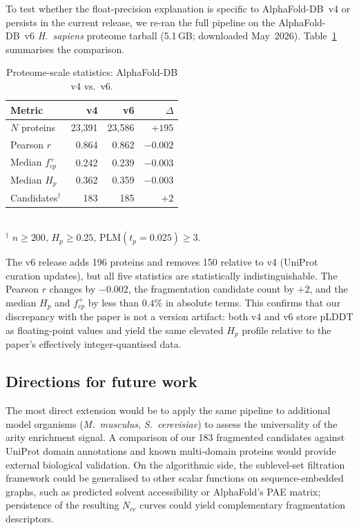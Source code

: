 To test whether the float-precision explanation is specific to
AlphaFold-DB~v4 or persists in the current release, we re-ran the full
pipeline on the AlphaFold-DB~v6 \textit{H.~sapiens} proteome tarball
(5.1\,GB; downloaded May~2026).
Table~\ref{tab:v4v6} summarises the comparison.

\begin{table}[h]
  \caption{Proteome-scale statistics: AlphaFold-DB v4 vs.\ v6.}
  \label{tab:v4v6}
  \centering
  \small
  \begin{tabular}{@{}lrrr@{}}
    \toprule
    Metric & v4 & v6 & $\Delta$ \\
    \midrule
    $N$ proteins           & 23{,}391 & 23{,}586 & $+195$   \\
    Pearson $r$            & 0.864    & 0.862    & $-0.002$ \\
    Median $f^+_{cp}$      & 0.242    & 0.239    & $-0.003$ \\
    Median $H_p$           & 0.362    & 0.359    & $-0.003$ \\
    Candidates$^\dagger$   & 183      & 185      & $+2$     \\
    \bottomrule
  \end{tabular}\\[3pt]
  \footnotesize $^\dagger$ $n \geq 200$, $H_p \geq 0.25$,
  $\mathrm{PLM}(t_p{=}0.025) \geq 3$.
\end{table}

The v6 release adds 196 proteins and removes 150 relative to v4 (UniProt
curation updates), but all five statistics are statistically
indistinguishable.
The Pearson $r$ changes by $-0.002$, the fragmentation candidate count by
$+2$, and the median $H_p$ and $f^+_{cp}$ by less than $0.4\%$ in absolute
terms.
This confirms that our discrepancy with the paper is not a version artifact:
both v4 and v6 store pLDDT as floating-point values and yield the same
elevated $H_p$ profile relative to the paper's effectively integer-quantised
data.

\subsection{Directions for future work}
\label{sec:disc_future}

The most direct extension would be to apply the same pipeline to additional
model organisms
(\textit{M.\ musculus}, \textit{S.\ cerevisiae}) to assess the
universality of the arity enrichment signal.
A comparison of our 183 fragmented candidates against UniProt domain
annotations and known multi-domain proteins would provide external
biological validation.
On the algorithmic side, the sublevel-set filtration framework could be
generalised to other scalar functions on sequence-embedded graphs,
such as predicted solvent accessibility or AlphaFold's PAE matrix;
persistence of the resulting $N_{cc}$ curves could yield
complementary fragmentation descriptors.


